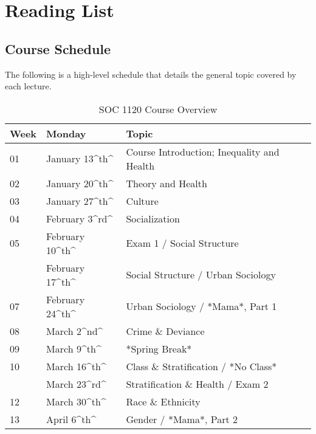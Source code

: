 \documentclass[]{book}
\begin{document}
\hypertarget{part-reading-list}{%
\part{Reading List}\label{part-reading-list}}

\hypertarget{course-schedule}{%
\chapter{Course Schedule}\label{course-schedule}}

The following is a high-level schedule that details the general topic covered by each lecture.

\begin{table}

\caption{\label{tab:unnamed-chunk-1}SOC 1120 Course Overview}
\centering
\begin{tabular}[t]{lll}
\toprule
Week & Monday & Topic\\
\midrule
01 & January 13\textasciicircum{}th\textasciicircum{} & Course Introduction; Inequality and Health\\
02 & January 20\textasciicircum{}th\textasciicircum{} & Theory and Health\\
03 & January 27\textasciicircum{}th\textasciicircum{} & Culture\\
04 & February 3\textasciicircum{}rd\textasciicircum{} & Socialization\\
05 & February 10\textasciicircum{}th\textasciicircum{} & Exam 1 / Social Structure\\
\addlinespace
06 & February 17\textasciicircum{}th\textasciicircum{} & Social Structure / Urban Sociology\\
07 & February 24\textasciicircum{}th\textasciicircum{} & Urban Sociology / *Mama*, Part 1\\
08 & March 2\textasciicircum{}nd\textasciicircum{} & Crime \& Deviance\\
09 & March 9\textasciicircum{}th\textasciicircum{} & *Spring Break*\\
10 & March 16\textasciicircum{}th\textasciicircum{} & Class \& Stratification / *No Class*\\
\addlinespace
11 & March 23\textasciicircum{}rd\textasciicircum{} & Stratification \& Health / Exam 2\\
12 & March 30\textasciicircum{}th\textasciicircum{} & Race \& Ethnicity\\
13 & April 6\textasciicircum{}th\textasciicircum{} & Gender / *Mama*, Part 2\\

\end{tabular}
\end{table}
\end{document}
